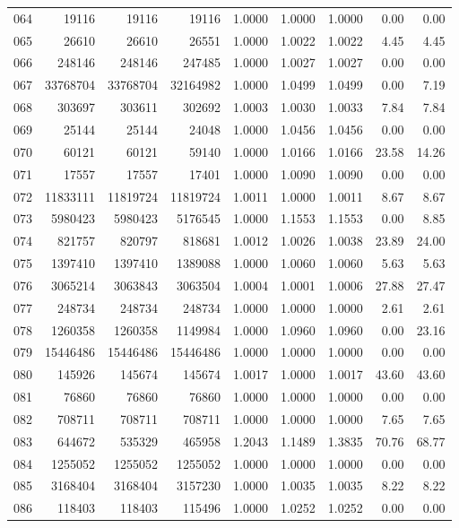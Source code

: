 \begin{longtable}{crrrrrrrr}
064 & 19116 & 19116 & 19116 & 1.0000 & 1.0000 & 1.0000 & 0.00 & 0.00 \\
065 & 26610 & 26610 & 26551 & 1.0000 & 1.0022 & 1.0022 & 4.45 & 4.45 \\
066 & 248146 & 248146 & 247485 & 1.0000 & 1.0027 & 1.0027 & 0.00 & 0.00 \\
067 & 33768704 & 33768704 & 32164982 & 1.0000 & 1.0499 & 1.0499 & 0.00 & 7.19 \\
068 & 303697 & 303611 & 302692 & 1.0003 & 1.0030 & 1.0033 & 7.84 & 7.84 \\
069 & 25144 & 25144 & 24048 & 1.0000 & 1.0456 & 1.0456 & 0.00 & 0.00 \\
070 & 60121 & 60121 & 59140 & 1.0000 & 1.0166 & 1.0166 & 23.58 & 14.26 \\
071 & 17557 & 17557 & 17401 & 1.0000 & 1.0090 & 1.0090 & 0.00 & 0.00 \\
072 & 11833111 & 11819724 & 11819724 & 1.0011 & 1.0000 & 1.0011 & 8.67 & 8.67 \\
073 & 5980423 & 5980423 & 5176545 & 1.0000 & 1.1553 & 1.1553 & 0.00 & 8.85 \\
074 & 821757 & 820797 & 818681 & 1.0012 & 1.0026 & 1.0038 & 23.89 & 24.00 \\
075 & 1397410 & 1397410 & 1389088 & 1.0000 & 1.0060 & 1.0060 & 5.63 & 5.63 \\
076 & 3065214 & 3063843 & 3063504 & 1.0004 & 1.0001 & 1.0006 & 27.88 & 27.47 \\
077 & 248734 & 248734 & 248734 & 1.0000 & 1.0000 & 1.0000 & 2.61 & 2.61 \\
078 & 1260358 & 1260358 & 1149984 & 1.0000 & 1.0960 & 1.0960 & 0.00 & 23.16 \\
079 & 15446486 & 15446486 & 15446486 & 1.0000 & 1.0000 & 1.0000 & 0.00 & 0.00 \\
080 & 145926 & 145674 & 145674 & 1.0017 & 1.0000 & 1.0017 & 43.60 & 43.60 \\
081 & 76860 & 76860 & 76860 & 1.0000 & 1.0000 & 1.0000 & 0.00 & 0.00 \\
082 & 708711 & 708711 & 708711 & 1.0000 & 1.0000 & 1.0000 & 7.65 & 7.65 \\
083 & 644672 & 535329 & 465958 & 1.2043 & 1.1489 & 1.3835 & 70.76 & 68.77 \\
084 & 1255052 & 1255052 & 1255052 & 1.0000 & 1.0000 & 1.0000 & 0.00 & 0.00 \\
085 & 3168404 & 3168404 & 3157230 & 1.0000 & 1.0035 & 1.0035 & 8.22 & 8.22 \\
086 & 118403 & 118403 & 115496 & 1.0000 & 1.0252 & 1.0252 & 0.00 & 0.00 \\

\end{longtable}
